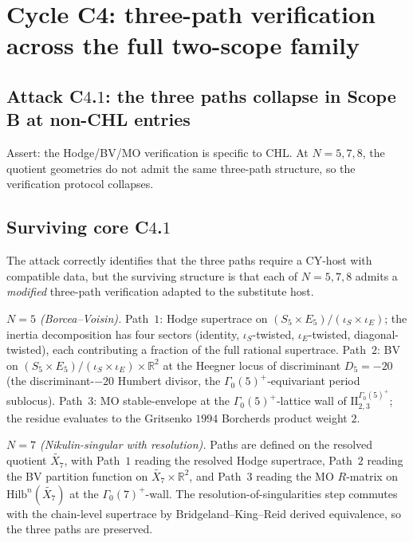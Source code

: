 \section{Cycle C4: three-path verification across the full two-scope
family}
\label{sec:cycle-c4-three-path-full}

\subsection*{Attack C$4$.$1$: the three paths collapse in Scope B at
non-CHL entries}

Assert: the Hodge/BV/MO verification is specific to CHL. At $N = 5, 7,
8$, the quotient geometries do not admit the same three-path structure,
so the verification protocol collapses.

\subsection*{Surviving core C$4$.$1$}

The attack correctly identifies that the three paths require a CY-host
with compatible data, but the surviving structure is that each of
$N = 5, 7, 8$ admits a \emph{modified} three-path verification adapted to
the substitute host.

\emph{$N = 5$ (Borcea--Voisin).} Path~$1$: Hodge supertrace on
$(S_5 \times E_5) / (\iota_S \times \iota_E)$; the inertia
decomposition has four sectors (identity, $\iota_S$-twisted,
$\iota_E$-twisted, diagonal-twisted), each contributing a fraction of
the full rational supertrace. Path~$2$: BV on
$(S_5 \times E_5) / (\iota_S \times \iota_E) \times \mathbb{R}^2$ at the
Heegner locus of discriminant $D_5 = -20$ (the discriminant-$-20$
Humbert divisor, the $\Gamma_0(5)^+$-equivariant period sublocus).
Path~$3$: MO stable-envelope at the $\Gamma_0(5)^+$-lattice wall of
$\mathrm{II}_{2, 3}^{\Gamma_0(5)^+}$; the residue evaluates to the
Gritsenko $1994$ Borcherds product weight $2$.

\emph{$N = 7$ (Nikulin-singular with resolution).} Paths are defined on
the resolved quotient $\widetilde{X_7}$, with Path~$1$ reading the
resolved Hodge supertrace, Path~$2$ reading the BV partition function
on $\widetilde{X_7} \times \mathbb{R}^2$, and Path~$3$ reading the MO
$R$-matrix on $\mathrm{Hilb}^n(\widetilde{X_7})$ at the
$\Gamma_0(7)^+$-wall. The resolution-of-singularities step commutes
with the chain-level supertrace by Bridgeland--King--Reid derived
equivalence, so the three paths are preserved.

